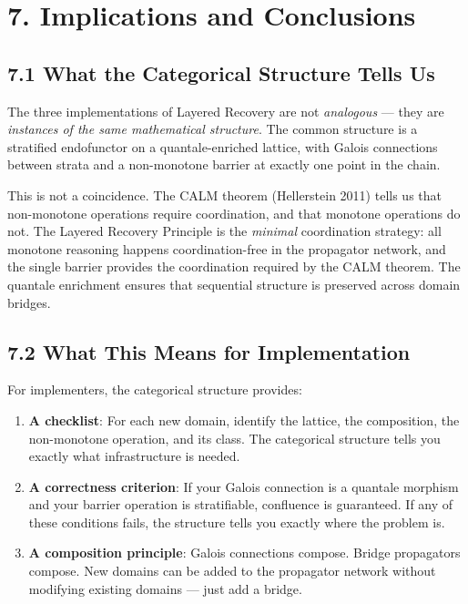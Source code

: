 \documentclass[11pt]{article}
\begin{document}
\section{7. Implications and Conclusions}
\label{sec:orgaf133f8}

\subsection{7.1 What the Categorical Structure Tells Us}
\label{sec:org654e302}

The three implementations of Layered Recovery are not \emph{analogous} — they are
\emph{instances of the same mathematical structure}. The common structure is a
stratified endofunctor on a quantale-enriched lattice, with Galois connections
between strata and a non-monotone barrier at exactly one point in the chain.

This is not a coincidence. The CALM theorem (Hellerstein 2011) tells us that
non-monotone operations require coordination, and that monotone operations do
not. The Layered Recovery Principle is the \emph{minimal} coordination strategy: all
monotone reasoning happens coordination-free in the propagator network, and the
single barrier provides the coordination required by the CALM theorem. The
quantale enrichment ensures that sequential structure is preserved across
domain bridges.
\subsection{7.2 What This Means for Implementation}
\label{sec:org113a45b}

For implementers, the categorical structure provides:

\begin{enumerate}
\item \textbf{A checklist}: For each new domain, identify the lattice, the composition,
the non-monotone operation, and its class. The categorical structure tells
you exactly what infrastructure is needed.

\item \textbf{A correctness criterion}: If your Galois connection is a quantale morphism
and your barrier operation is stratifiable, confluence is guaranteed. If any
of these conditions fails, the structure tells you exactly where the problem
is.

\item \textbf{A composition principle}: Galois connections compose. Bridge propagators
compose. New domains can be added to the propagator network without modifying
existing domains — just add a bridge.
\end{enumerate}
\end{document}
